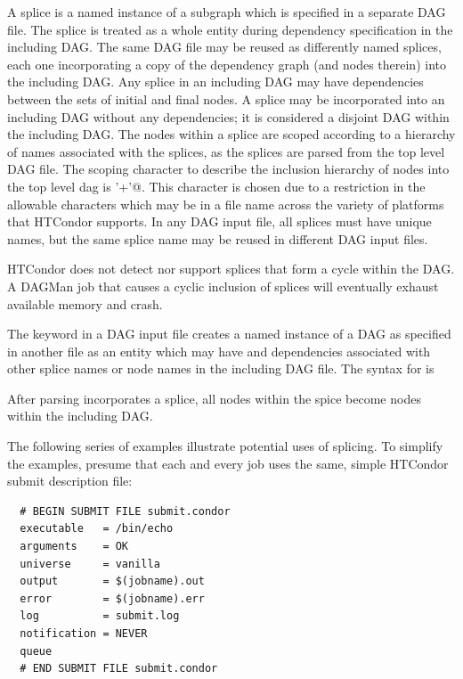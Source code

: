 A splice is a named instance of a subgraph which is specified in a
separate DAG file.
The splice is treated as a whole entity during dependency
specification in the including DAG.
The same DAG file may be reused as differently named splices,
each one
incorporating a copy of the dependency graph (and nodes therein) into the
including DAG. 
Any splice in an including DAG may have dependencies
between the sets of initial and final nodes.
A splice may be incorporated into an including DAG without any
dependencies; it is considered
a disjoint DAG within the including DAG.
The nodes within a splice are scoped according to
a hierarchy of names associated with the splices,
as the splices are parsed from the top level DAG file.
The scoping character to describe the
inclusion hierarchy of nodes into the top level dag is 
\verb@'+'@.
This character is chosen due
to a restriction in the allowable characters which may be in a file name
across the variety of platforms that HTCondor supports.
In any DAG input file, all splices must have unique names,
but the same splice name may be reused in different DAG input files.

HTCondor does not detect nor support splices that form a cycle
within the DAG.
A DAGMan job that causes a cyclic inclusion of splices will
eventually exhaust available memory and crash.

The  keyword in a DAG input file
creates a named instance of a DAG as specified
in another file as an entity which may have  and 
dependencies associated with other splice names or node names in the
including DAG file.
The syntax for  is

   

After parsing incorporates a splice,
all nodes within the spice become nodes within the including DAG.


The following series of examples illustrate potential uses of
splicing. To simplify the examples,
presume that each and every job uses the same,
simple HTCondor submit description file:

\begin{verbatim}
  # BEGIN SUBMIT FILE submit.condor
  executable   = /bin/echo
  arguments    = OK
  universe     = vanilla
  output       = $(jobname).out
  error        = $(jobname).err
  log          = submit.log
  notification = NEVER
  queue
  # END SUBMIT FILE submit.condor
\end{verbatim}

